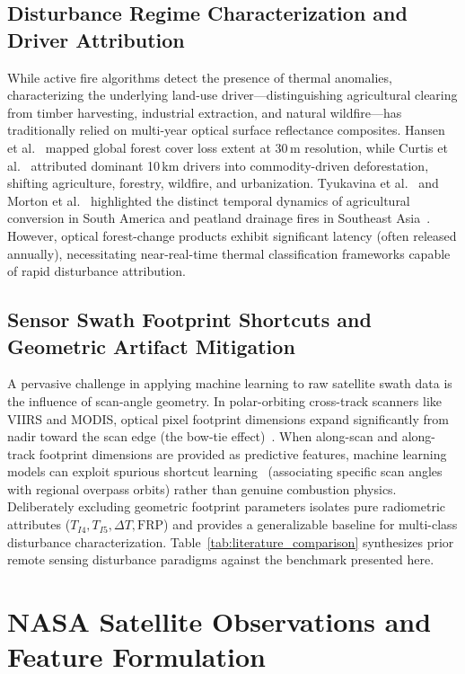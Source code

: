 \documentclass[conference]{IEEEtran}
\begin{document}
\subsection{Disturbance Regime Characterization and Driver Attribution}
While active fire algorithms detect the presence of thermal anomalies, characterizing the underlying land-use driver---distinguishing agricultural clearing from timber harvesting, industrial extraction, and natural wildfire---has traditionally relied on multi-year optical surface reflectance composites. Hansen et al.~\cite{hansen2013} mapped global forest cover loss extent at 30\,m resolution, while Curtis et al.~\cite{curtis2018} attributed dominant 10\,km drivers into commodity-driven deforestation, shifting agriculture, forestry, wildfire, and urbanization. Tyukavina et al.~\cite{tyukavina2022} and Morton et al.~\cite{morton2006} highlighted the distinct temporal dynamics of agricultural conversion in South America and peatland drainage fires in Southeast Asia~\cite{page2002}. However, optical forest-change products exhibit significant latency (often released annually), necessitating near-real-time thermal classification frameworks capable of rapid disturbance attribution.

\subsection{Sensor Swath Footprint Shortcuts and Geometric Artifact Mitigation}
A pervasive challenge in applying machine learning to raw satellite swath data is the influence of scan-angle geometry. In polar-orbiting cross-track scanners like VIIRS and MODIS, optical pixel footprint dimensions expand significantly from nadir toward the scan edge (the bow-tie effect)~\cite{wolfe2002}. When along-scan and along-track footprint dimensions are provided as predictive features, machine learning models can exploit spurious shortcut learning~\cite{geirhos2020} (associating specific scan angles with regional overpass orbits) rather than genuine combustion physics. Deliberately excluding geometric footprint parameters isolates pure radiometric attributes ($T_{I4}, T_{I5}, \Delta T, \text{FRP}$) and provides a generalizable baseline for multi-class disturbance characterization. Table~\ref{tab:literature_comparison} synthesizes prior remote sensing disturbance paradigms against the benchmark presented here.



\section{NASA Satellite Observations and Feature Formulation}
\end{document}
